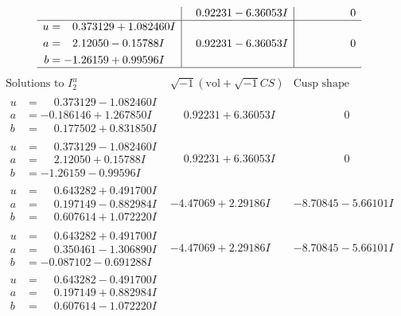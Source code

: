 \documentclass[1p]{elsarticle_modified}
\theoremstyle{definition}
\newcommand{\I}{\sqrt{-1}}
\begin{document}
$$\begin{array}{c|c|c}
 & \phantom{-}0.92231 - 6.36053 I & \phantom{-0.000000 } 0 \\ \hline\begin{aligned}
u &= \phantom{-}0.373129 + 1.082460 I \\
a &= \phantom{-}2.12050 - 0.15788 I \\
b &= -1.26159 + 0.99596 I\end{aligned}
 & \phantom{-}0.92231 - 6.36053 I & \phantom{-0.000000 } 0\\
 \hline 
 \end{array}$$\newpage$$\begin{array}{c|c|c}  
\text{Solutions to }I^u_{2}& \I (\text{vol} + \sqrt{-1}CS) & \text{Cusp shape}\\
 \hline 
\begin{aligned}
u &= \phantom{-}0.373129 - 1.082460 I \\
a &= -0.186146 + 1.267850 I \\
b &= \phantom{-}0.177502 + 0.831850 I\end{aligned}
 & \phantom{-}0.92231 + 6.36053 I & \phantom{-0.000000 } 0 \\ \hline\begin{aligned}
u &= \phantom{-}0.373129 - 1.082460 I \\
a &= \phantom{-}2.12050 + 0.15788 I \\
b &= -1.26159 - 0.99596 I\end{aligned}
 & \phantom{-}0.92231 + 6.36053 I & \phantom{-0.000000 } 0 \\ \hline\begin{aligned}
u &= \phantom{-}0.643282 + 0.491700 I \\
a &= \phantom{-}0.197149 - 0.882984 I \\
b &= \phantom{-}0.607614 + 1.072220 I\end{aligned}
 & -4.47069 + 2.29186 I & -8.70845 - 5.66101 I \\ \hline\begin{aligned}
u &= \phantom{-}0.643282 + 0.491700 I \\
a &= \phantom{-}0.350461 - 1.306890 I \\
b &= -0.087102 - 0.691288 I\end{aligned}
 & -4.47069 + 2.29186 I & -8.70845 - 5.66101 I \\ \hline\begin{aligned}
u &= \phantom{-}0.643282 - 0.491700 I \\
a &= \phantom{-}0.197149 + 0.882984 I \\
b &= \phantom{-}0.607614 - 1.072220 I\end{aligned}

\end{array}$$
\end{document}
